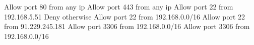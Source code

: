 \markdownRendererInterblockSeparator
{}\markdownRendererInterblockSeparator
{}Allow port 80 from any ip Allow port 443 from any ip Allow port 22 from 192.168.5.51 Deny otherwise\markdownRendererInterblockSeparator
{}\markdownRendererInterblockSeparator
{}Allow port 22 from 192.168.0.0/16\markdownRendererInterblockSeparator
{}\markdownRendererInterblockSeparator
{}Allow port 22 from 91.229.245.181\markdownRendererInterblockSeparator
{}\markdownRendererInterblockSeparator
{}Allow port 3306 from 192.168.0.0/16\markdownRendererInterblockSeparator
{}\markdownRendererInterblockSeparator
{}Allow port 3306 from 192.168.0.0/16\relax